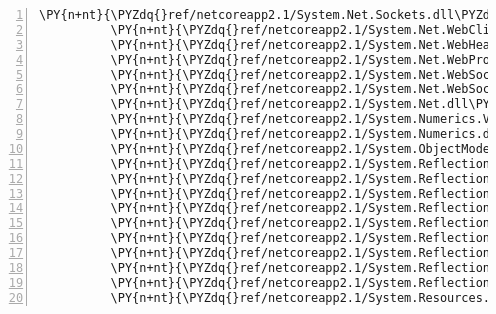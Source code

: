 \begin{Verbatim}[commandchars=\\\{\},numbers=left,firstnumber=1,stepnumber=1,numberblanklines=0]
          \PY{n+nt}{\PYZdq{}ref/netcoreapp2.1/System.Net.Sockets.dll\PYZdq{}}\PY{p}{:} \PY{p}{\PYZob{}}\PY{p}{\PYZcb{}}\PY{p}{,}
          \PY{n+nt}{\PYZdq{}ref/netcoreapp2.1/System.Net.WebClient.dll\PYZdq{}}\PY{p}{:} \PY{p}{\PYZob{}}\PY{p}{\PYZcb{}}\PY{p}{,}
          \PY{n+nt}{\PYZdq{}ref/netcoreapp2.1/System.Net.WebHeaderCollection.dll\PYZdq{}}\PY{p}{:} \PY{p}{\PYZob{}}\PY{p}{\PYZcb{}}\PY{p}{,}
          \PY{n+nt}{\PYZdq{}ref/netcoreapp2.1/System.Net.WebProxy.dll\PYZdq{}}\PY{p}{:} \PY{p}{\PYZob{}}\PY{p}{\PYZcb{}}\PY{p}{,}
          \PY{n+nt}{\PYZdq{}ref/netcoreapp2.1/System.Net.WebSockets.Client.dll\PYZdq{}}\PY{p}{:} \PY{p}{\PYZob{}}\PY{p}{\PYZcb{}}\PY{p}{,}
          \PY{n+nt}{\PYZdq{}ref/netcoreapp2.1/System.Net.WebSockets.dll\PYZdq{}}\PY{p}{:} \PY{p}{\PYZob{}}\PY{p}{\PYZcb{}}\PY{p}{,}
          \PY{n+nt}{\PYZdq{}ref/netcoreapp2.1/System.Net.dll\PYZdq{}}\PY{p}{:} \PY{p}{\PYZob{}}\PY{p}{\PYZcb{}}\PY{p}{,}
          \PY{n+nt}{\PYZdq{}ref/netcoreapp2.1/System.Numerics.Vectors.dll\PYZdq{}}\PY{p}{:} \PY{p}{\PYZob{}}\PY{p}{\PYZcb{}}\PY{p}{,}
          \PY{n+nt}{\PYZdq{}ref/netcoreapp2.1/System.Numerics.dll\PYZdq{}}\PY{p}{:} \PY{p}{\PYZob{}}\PY{p}{\PYZcb{}}\PY{p}{,}
          \PY{n+nt}{\PYZdq{}ref/netcoreapp2.1/System.ObjectModel.dll\PYZdq{}}\PY{p}{:} \PY{p}{\PYZob{}}\PY{p}{\PYZcb{}}\PY{p}{,}
          \PY{n+nt}{\PYZdq{}ref/netcoreapp2.1/System.Reflection.DispatchProxy.dll\PYZdq{}}\PY{p}{:} \PY{p}{\PYZob{}}\PY{p}{\PYZcb{}}\PY{p}{,}
          \PY{n+nt}{\PYZdq{}ref/netcoreapp2.1/System.Reflection.Emit.ILGeneration.dll\PYZdq{}}\PY{p}{:} \PY{p}{\PYZob{}}\PY{p}{\PYZcb{}}\PY{p}{,}
          \PY{n+nt}{\PYZdq{}ref/netcoreapp2.1/System.Reflection.Emit.Lightweight.dll\PYZdq{}}\PY{p}{:} \PY{p}{\PYZob{}}\PY{p}{\PYZcb{}}\PY{p}{,}
          \PY{n+nt}{\PYZdq{}ref/netcoreapp2.1/System.Reflection.Emit.dll\PYZdq{}}\PY{p}{:} \PY{p}{\PYZob{}}\PY{p}{\PYZcb{}}\PY{p}{,}
          \PY{n+nt}{\PYZdq{}ref/netcoreapp2.1/System.Reflection.Extensions.dll\PYZdq{}}\PY{p}{:} \PY{p}{\PYZob{}}\PY{p}{\PYZcb{}}\PY{p}{,}
          \PY{n+nt}{\PYZdq{}ref/netcoreapp2.1/System.Reflection.Metadata.dll\PYZdq{}}\PY{p}{:} \PY{p}{\PYZob{}}\PY{p}{\PYZcb{}}\PY{p}{,}
          \PY{n+nt}{\PYZdq{}ref/netcoreapp2.1/System.Reflection.Primitives.dll\PYZdq{}}\PY{p}{:} \PY{p}{\PYZob{}}\PY{p}{\PYZcb{}}\PY{p}{,}
          \PY{n+nt}{\PYZdq{}ref/netcoreapp2.1/System.Reflection.TypeExtensions.dll\PYZdq{}}\PY{p}{:} \PY{p}{\PYZob{}}\PY{p}{\PYZcb{}}\PY{p}{,}
          \PY{n+nt}{\PYZdq{}ref/netcoreapp2.1/System.Reflection.dll\PYZdq{}}\PY{p}{:} \PY{p}{\PYZob{}}\PY{p}{\PYZcb{}}\PY{p}{,}
          \PY{n+nt}{\PYZdq{}ref/netcoreapp2.1/System.Resources.Reader.dll\PYZdq{}}\PY{p}{:} \PY{p}{\PYZob{}}\PY{p}{\PYZcb{}}\PY{p}{,}

\end{Verbatim}
